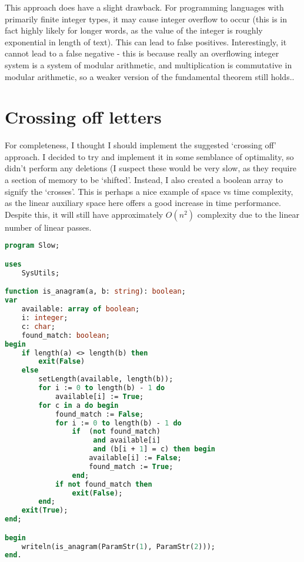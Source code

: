 \documentclass{article}
\begin{document}
    This approach does have a slight drawback. For programming languages with
    primarily finite integer types, it may cause integer overflow to occur
    (this is in fact highly likely for longer words, as the value of the
    integer is roughly exponential in length of text). This can lead to false
    positives. Interestingly, it cannot lead to a false negative - this is
    because really an overflowing integer system is a system of modular
    arithmetic, and multiplication is commutative in modular arithmetic, so a
    weaker version of the fundamental theorem still holds..

    \section{Crossing off letters}

    For completeness, I thought I should implement the suggested `crossing off'
    approach. I decided to try and implement it in some semblance of
    optimality, so didn't perform any deletions (I suspect these would be very
    slow, as they require a section of memory to be `shifted'. Instead, I also
    created a boolean array to signify the `crosses'. This is perhaps a nice
    example of space vs time complexity, as the linear auxiliary space here
    offers a good increase in time performance. Despite this, it will still
    have approximately $O(n^2)$ complexity due to the linear number of linear
    passes.

\begin{lstlisting}[language=Pascal, caption=`Crossing off' approach]
program Slow;

uses
    SysUtils;

function is_anagram(a, b: string): boolean;
var
    available: array of boolean;
    i: integer;
    c: char;
    found_match: boolean;
begin
    if length(a) <> length(b) then
        exit(False)
    else
        setLength(available, length(b));
        for i := 0 to length(b) - 1 do
            available[i] := True;
        for c in a do begin
            found_match := False;
            for i := 0 to length(b) - 1 do
                if  (not found_match)
                     and available[i]
                     and (b[i + 1] = c) then begin
                    available[i] := False;
                    found_match := True;
                end;
            if not found_match then
                exit(False);
        end;
    exit(True);
end;

begin
    writeln(is_anagram(ParamStr(1), ParamStr(2)));
end.
\end{lstlisting}
\end{document}
